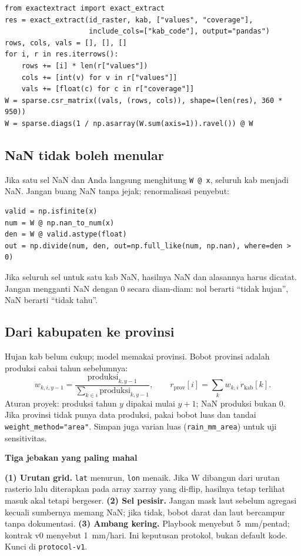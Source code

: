 \documentclass[9pt,a4paper]{extarticle}
\newcommand{\code}[1]{\texttt{\small\color{ink}#1}}
\newenvironment{warnbox}[1]
  {\begin{tcolorbox}[enhanced,breakable,colback=orangebg,colframe=orangebg,boxrule=0pt,arc=1.1mm,
    left=3mm,right=2.2mm,top=1.4mm,bottom=1.4mm,borderline west={2.2pt}{0pt}{accent2},
    before skip=3pt,after skip=3pt]
   \textcolor{accent2}{\sffamily\bfseries #1}\par\vspace{0.5pt}}
  {\end{tcolorbox}}
\begin{document}
\begin{lstlisting}
from exactextract import exact_extract
res = exact_extract(id_raster, kab, ["values", "coverage"],
                    include_cols=["kab_code"], output="pandas")
rows, cols, vals = [], [], []
for i, r in res.iterrows():
    rows += [i] * len(r["values"])
    cols += [int(v) for v in r["values"]]
    vals += [float(c) for c in r["coverage"]]
W = sparse.csr_matrix((vals, (rows, cols)), shape=(len(res), 360 * 950))
W = sparse.diags(1 / np.asarray(W.sum(axis=1)).ravel()) @ W
\end{lstlisting}

\subsection{NaN tidak boleh menular}

Jika satu sel NaN dan Anda langsung menghitung \code{W @ x}, seluruh kab menjadi NaN. Jangan buang NaN tanpa jejak; renormalisasi penyebut:
\begin{lstlisting}
valid = np.isfinite(x)
num = W @ np.nan_to_num(x)
den = W @ valid.astype(float)
out = np.divide(num, den, out=np.full_like(num, np.nan), where=den > 0)
\end{lstlisting}
Jika seluruh sel untuk satu kab NaN, hasilnya NaN dan alasannya harus dicatat. Jangan mengganti NaN dengan 0 secara diam-diam: nol berarti ``tidak hujan'', NaN berarti ``tidak tahu''.

\subsection{Dari kabupaten ke provinsi}

Hujan kab belum cukup; model memakai provinsi. Bobot provinsi adalah produksi cabai tahun sebelumnya:
\[
w_{k,i,y-1} = \frac{\text{produksi}_{k,y-1}}{\sum_{k\in i}\text{produksi}_{k,y-1}},
\qquad
r_{\text{prov}}[i] = \sum_k w_{k,i}\,r_{\text{kab}}[k].
\]
Aturan proyek: produksi tahun $y$ dipakai mulai $y+1$; NaN produksi bukan 0. Jika provinsi tidak punya data produksi, pakai bobot luas dan tandai \code{weight\_method="area"}. Simpan juga varian luas (\code{rain\_mm\_area}) untuk uji sensitivitas.

\begin{warnbox}{Tiga jebakan yang paling mahal}
\textbf{(1) Urutan grid.} \code{lat} menurun, \code{lon} menaik. Jika W dibangun dari urutan rasterio lalu diterapkan pada array xarray yang di-flip, hasilnya tetap terlihat masuk akal tetapi bergeser. \textbf{(2) Sel pesisir.} Jangan mask laut sebelum agregasi kecuali sumbernya memang NaN; jika tidak, bobot darat dan laut bercampur tanpa dokumentasi. \textbf{(3) Ambang kering.} Playbook menyebut 5~mm/pentad; kontrak v0 menyebut 1~mm/hari. Ini keputusan protokol, bukan default kode. Kunci di \code{protocol-v1}.
\end{warnbox}
\end{document}
